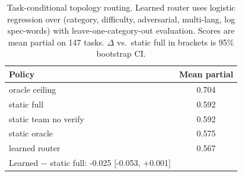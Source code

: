 \begin{table}[h]\centering\small
\caption{Task-conditional topology routing. Learned router uses logistic regression over (category, difficulty, adversarial, multi-lang, log spec-words) with leave-one-category-out evaluation. Scores are mean partial on 147 tasks. $\Delta$ vs.\ static full in brackets is 95\% bootstrap CI.
}
\label{tab:router}
\begin{tabular}{lc}\toprule
Policy & Mean partial \\ \midrule
oracle ceiling & 0.704 \\
static full & 0.592 \\
static team no verify & 0.592 \\
static oracle & 0.575 \\
learned router & 0.567 \\
\midrule
Learned $-$ static full: -0.025 [-0.053, +0.001] & \\
\bottomrule\end{tabular}\end{table}